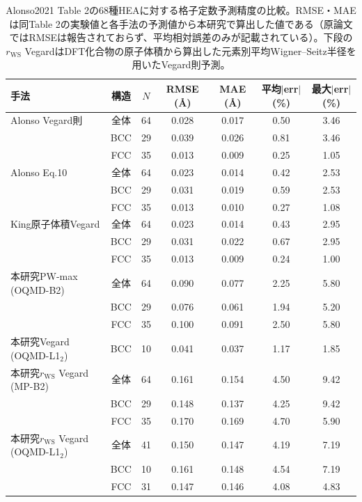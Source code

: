 \documentclass[a4paper,10pt,5p]{elsarticle}
\begin{document}
\begin{table}[htbp]
\centering
\caption{Alonso2021 Table 2の68種HEAに対する格子定数予測精度の比較。RMSE・MAEは同Table 2の実験値と各手法の予測値から本研究で算出した値である（原論文ではRMSEは報告されておらず、平均相対誤差のみが記載されている）。下段の$r_\mathrm{WS}$ VegardはDFT化合物の原子体積から算出した元素別平均Wigner--Seitz半径を用いたVegard則予測。}
\label{tab:alonso_comparison}
\begin{tabular}{lcccccc}
\hline
\textbf{手法} & \textbf{構造} & $N$ & \textbf{RMSE (\AA)} & \textbf{MAE (\AA)} & \textbf{平均$|$err$|$ (\%)} & \textbf{最大$|$err$|$ (\%)} \\
\hline
Alonso Vegard則     & 全体 & 64 & 0.028 & 0.017 & 0.50 & 3.46 \\
                    & BCC  & 29 & 0.039 & 0.026 & 0.81 & 3.46 \\
                    & FCC  & 35 & 0.013 & 0.009 & 0.25 & 1.05 \\
\hline
Alonso Eq.10        & 全体 & 64 & 0.023 & 0.014 & 0.42 & 2.53 \\
                    & BCC  & 29 & 0.031 & 0.019 & 0.59 & 2.53 \\
                    & FCC  & 35 & 0.013 & 0.010 & 0.27 & 1.08 \\
\hline
King原子体積Vegard   & 全体 & 64 & 0.023 & 0.014 & 0.43 & 2.95 \\
                    & BCC  & 29 & 0.031 & 0.022 & 0.67 & 2.95 \\
                    & FCC  & 35 & 0.013 & 0.009 & 0.24 & 1.00 \\
\hline
本研究PW-max (OQMD-B2) & 全体 & 64 & 0.090 & 0.077 & 2.25 & 5.80 \\
                       & BCC  & 29 & 0.076 & 0.061 & 1.94 & 5.20 \\
                       & FCC  & 35 & 0.100 & 0.091 & 2.50 & 5.80 \\
\hline
本研究Vegard (OQMD-L1$_2$) & BCC & 10 & 0.041 & 0.037 & 1.17 & 1.85 \\
\hline
本研究$r_\mathrm{WS}$ Vegard (MP-B2) & 全体 & 64 & 0.161 & 0.154 & 4.50 & 9.42 \\
                                     & BCC  & 29 & 0.148 & 0.137 & 4.25 & 9.42 \\
                                     & FCC  & 35 & 0.170 & 0.169 & 4.70 & 5.90 \\
\hline
本研究$r_\mathrm{WS}$ Vegard (OQMD-L1$_2$) & 全体 & 41 & 0.150 & 0.147 & 4.19 & 7.19 \\
                                            & BCC  & 10 & 0.161 & 0.148 & 4.54 & 7.19 \\
                                            & FCC  & 31 & 0.147 & 0.146 & 4.08 & 4.83 \\
\hline
\end{tabular}
\end{table}
\end{document}
